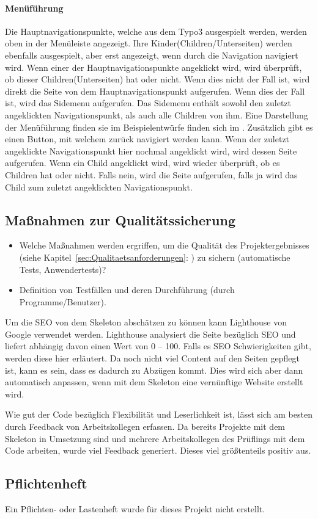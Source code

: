 \paragraph{Menüführung}  
\linebreak
Die Hauptnavigationspunkte, welche aus dem Typo3 ausgespielt werden, werden oben in der Menüleiste angezeigt. Ihre Kinder(Children/Unterseiten) werden ebenfalls ausgespielt, aber erst angezeigt, wenn durch die Navigation navigiert wird. Wenn einer der Hauptnavigationspunkte angeklickt wird, wird überprüft, ob dieser Children(Unterseiten) hat oder nicht. Wenn dies nicht der Fall ist, wird direkt die Seite von dem Hauptnavigationspunkt aufgerufen. Wenn dies der Fall ist, wird das Sidemenu aufgerufen. Das Sidemenu enthält sowohl den zuletzt angeklickten Navigationspunkt, als auch alle Children von ihm. Eine Darstellung der Menüführung finden sie im Beispielentwürfe finden sich im . Zusätzlich gibt es einen Button, mit welchem zurück navigiert werden kann. Wenn der zuletzt angeklickte Navigationspunkt hier nochmal angeklickt wird, wird dessen Seite aufgerufen. Wenn ein Child angeklickt wird, wird wieder überprüft, ob es Children hat oder nicht. Falls nein, wird die Seite aufgerufen, falls ja wird das Child zum zuletzt angeklickten Navigationspunkt. 


\subsection{Maßnahmen zur Qualitätssicherung}
\label{sec:Qualitaetssicherung}
\begin{itemize}
	\item Welche Maßnahmen werden ergriffen, um die Qualität des Projektergebnisses (siehe Kapitel~\ref{sec:Qualitaetsanforderungen}: ) zu sichern (\zB automatische Tests, Anwendertests)?
	\item \Ggfs Definition von Testfällen und deren Durchführung (durch Programme/Benutzer).
\end{itemize}

Um die SEO von dem Skeleton abschätzen zu können kann Lighthouse von Google verwendet werden. Lighthouse analysiert die Seite bezüglich SEO und liefert abhängig davon einen Wert von 0 – 100. Falls es SEO Schwierigkeiten gibt, werden diese hier erläutert. Da noch nicht viel Content auf den Seiten gepflegt ist, kann es sein, dass es dadurch zu Abzügen kommt. Dies wird sich aber dann automatisch anpassen, wenn mit dem Skeleton eine vernünftige Website erstellt wird.

Wie gut der Code bezüglich Flexibilität und Leserlichkeit ist, lässt sich am besten durch Feedback von Arbeitskollegen erfassen. Da bereits Projekte mit dem Skeleton in Umsetzung sind und mehrere Arbeitskollegen des Prüflings mit dem Code arbeiten, wurde viel Feedback generiert. Dieses viel größtenteils positiv aus.

\subsection{Pflichtenheft}
\label{sec:Pflichtenheft}

Ein Pflichten- oder Lastenheft wurde für dieses Projekt nicht erstellt. 

